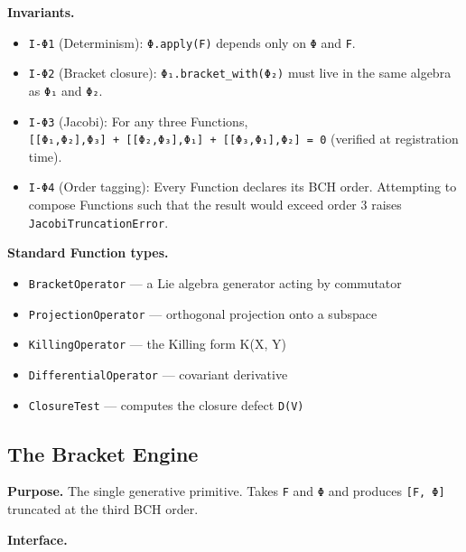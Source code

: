 \documentclass[11pt,a4paper]{article}
\providecommand{\tightlist}{\setlength{\itemsep}{0pt}\setlength{\parskip}{0pt}}
\begin{document}
\textbf{Invariants.}

\begin{itemize}
\tightlist
\item
  \texttt{I-Φ1} (Determinism): \texttt{Φ.apply(F)} depends only on
  \texttt{Φ} and \texttt{F}.
\item
  \texttt{I-Φ2} (Bracket closure): \texttt{Φ₁.bracket\_with(Φ₂)} must
  live in the same algebra as \texttt{Φ₁} and \texttt{Φ₂}.
\item
  \texttt{I-Φ3} (Jacobi): For any three Functions,
  \texttt{{[}{[}Φ₁,Φ₂{]},Φ₃{]}\ +\ {[}{[}Φ₂,Φ₃{]},Φ₁{]}\ +\ {[}{[}Φ₃,Φ₁{]},Φ₂{]}\ =\ 0}
  (verified at registration time).
\item
  \texttt{I-Φ4} (Order tagging): Every Function declares its BCH order.
  Attempting to compose Functions such that the result would exceed
  order 3 raises \texttt{JacobiTruncationError}.
\end{itemize}

\textbf{Standard Function types.}

\begin{itemize}
\tightlist
\item
  \texttt{BracketOperator} --- a Lie algebra generator acting by
  commutator
\item
  \texttt{ProjectionOperator} --- orthogonal projection onto a subspace
\item
  \texttt{KillingOperator} --- the Killing form K(X, Y)
\item
  \texttt{DifferentialOperator} --- covariant derivative
\item
  \texttt{ClosureTest} --- computes the closure defect \texttt{D(V)}
\end{itemize}

\hypertarget{the-bracket-engine}{%
\subsection{The Bracket Engine}\label{the-bracket-engine}}

\textbf{Purpose.} The single generative primitive. Takes \texttt{F} and
\texttt{Φ} and produces \texttt{{[}F,\ Φ{]}} truncated at the third BCH
order.

\textbf{Interface.}
\end{document}
